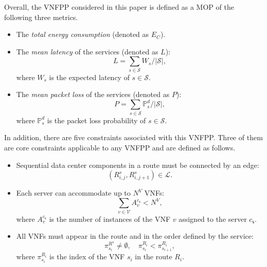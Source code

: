 Overall, the VNFPP considered in this paper is defined as a MOP of the following three metrics.
\begin{itemize}
	\item The \textit{total energy consumption} (denoted as $E_C$).
	\item The \textit{mean latency} of the services (denoted as $L$):
	      \begin{equation}
		      L=\sum_{s\in\mathcal{S}} W_{s}/|\mathcal{S}|,
	      \end{equation}
	      where $W_s$ is the expected latency of $s\in\mathcal{S}$.
	\item The \textit{mean packet loss} of the services (denoted as $P$):
	      \begin{equation}
		      P=\sum_{s\in\mathcal{S}} \mathbb{P}^d_s/|\mathcal{S}|,
	      \end{equation}
	      where $\mathbb{P}^d_s$ is the packet loss probability of $s\in\mathcal{S}$.
\end{itemize}
In addition, there are five constraints associated with this VNFPP. Three of them are core constraints applicable to any VNFPP and are defined as follows.%
\begin{itemize}
	\item Sequential data center components in a route must be connected by an edge:
	      \begin{equation}
		      (R_{i,j}^s, R_{i,j+1}^s) \in \mathcal{L}.
	      \end{equation}
	\item Each server can accommodate up to $N^V$ VNFs:
	      \begin{equation}
		      \sum_{v\in\mathcal{V}} A_v^{c_{\mathsf{s}}}<N^V,
	      \end{equation}
	      where $A_v^{c_{\mathsf{s}}}$ is the number of instances of the VNF $v$ assigned to the server ${c_{\mathsf{s}}}$.
	\item All VNFs must appear in the route and in the order defined by the service:
	      \begin{equation}
		      \pi^{R^s}_{s_i}\neq\emptyset,\quad\pi^{R_i}_{s_i}<\pi^{R_i}_{s_{i+1}},
	      \end{equation}
	      where $\pi^{R_i}_{s_i}$ is the index of the VNF $s_i$ in the route $R_i$.
\end{itemize}

